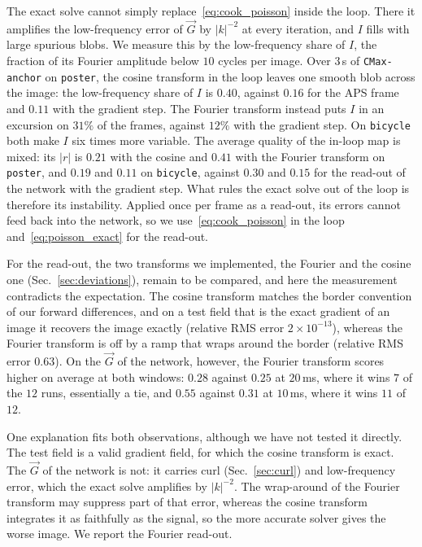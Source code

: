 \documentclass[journal]{IEEEtran}
\newcommand{\Imap}{I}
\newcommand{\Gmap}{\vec{G}}
\begin{document}
The exact solve cannot simply replace~\eqref{eq:cook_poisson} inside the loop. There it amplifies the low-frequency error of $\Gmap$ by $\lvert k\rvert^{-2}$ at every iteration, and $\Imap$ fills with large spurious blobs. We measure this by the low-frequency share of $\Imap$, the fraction of its Fourier amplitude below $10$ cycles per image. Over $3$\,s of \texttt{CMax-anchor} on \texttt{poster}, the cosine transform in the loop leaves one smooth blob across the image: the low-frequency share of $\Imap$ is $0.40$, against $0.16$ for the APS frame and $0.11$ with the gradient step. The Fourier transform instead puts $\Imap$ in an excursion on $31\%$ of the frames, against $12\%$ with the gradient step. On \texttt{bicycle} both make $\Imap$ six times more variable. The average quality of the in-loop map is mixed: its $|r|$ is $0.21$ with the cosine and $0.41$ with the Fourier transform on \texttt{poster}, and $0.19$ and $0.11$ on \texttt{bicycle}, against $0.30$ and $0.15$ for the read-out of the network with the gradient step. What rules the exact solve out of the loop is therefore its instability. Applied once per frame as a read-out, its errors cannot feed back into the network, so we use~\eqref{eq:cook_poisson} in the loop and~\eqref{eq:poisson_exact} for the read-out.

For the read-out, the two transforms we implemented, the Fourier and the cosine one (Sec.~\ref{sec:deviations}), remain to be compared, and here the measurement contradicts the expectation. The cosine transform matches the border convention of our forward differences, and on a test field that is the exact gradient of an image it recovers the image exactly (relative RMS error $2\!\times\!10^{-13}$), whereas the Fourier transform is off by a ramp that wraps around the border (relative RMS error $0.63$). On the $\Gmap$ of the network, however, the Fourier transform scores higher on average at both windows: $0.28$ against $0.25$ at $20$\,ms, where it wins $7$ of the $12$ runs, essentially a tie, and $0.55$ against $0.31$ at $10$\,ms, where it wins $11$ of $12$.

One explanation fits both observations, although we have not tested it directly. The test field is a valid gradient field, for which the cosine transform is exact. The $\Gmap$ of the network is not: it carries curl (Sec.~\ref{sec:curl}) and low-frequency error, which the exact solve amplifies by $\lvert k\rvert^{-2}$. The wrap-around of the Fourier transform may suppress part of that error, whereas the cosine transform integrates it as faithfully as the signal, so the more accurate solver gives the worse image. We report the Fourier read-out.
\end{document}
